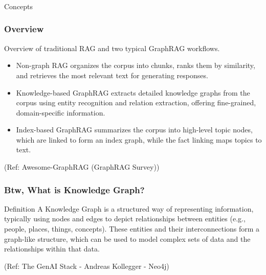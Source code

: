 \begin{frame}[fragile]\frametitle{}
\begin{center}
{\Large Concepts}
\end{center}
\end{frame}


\begin{frame}[fragile]\frametitle{Overview}

Overview of traditional RAG and two typical GraphRAG workflows.

    \begin{itemize}
        \item Non-graph RAG organizes the corpus into chunks, ranks them by similarity, and retrieves the most relevant text for generating responses.
        \item Knowledge-based GraphRAG extracts detailed knowledge graphs from the corpus using entity recognition and relation extraction, offering fine-grained, domain-specific information.
        \item Index-based GraphRAG summarizes the corpus into high-level topic nodes, which are linked to form an index graph, while the fact linking maps topics to text.
    \end{itemize}
	
	{\tiny (Ref: Awesome-GraphRAG (GraphRAG Survey))}
	
\end{frame}


\begin{frame}[fragile]\frametitle{Btw, What is Knowledge Graph?}
    \begin{block}{Definition}
A Knowledge Graph is a structured way of representing 
information, typically using nodes and edges to depict 
relationships between entities (e.g., people, places, 
things, concepts). 
These entities and their interconnections form a 
graph-like structure, which can be used to model 
complex sets of data and the relationships within that 
data.
    \end{block}
	
	{\tiny (Ref: The GenAI Stack - Andreas Kollegger - Neo4j)}
	
\end{frame}


